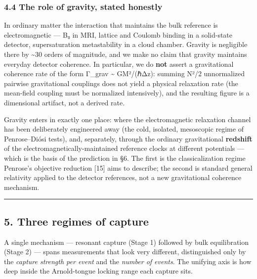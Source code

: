 \documentclass[
]{article}
\begin{document}
\subsubsection{4.4 The role of gravity, stated
honestly}\label{the-role-of-gravity-stated-honestly}

In ordinary matter the interaction that maintains the bulk reference is
electromagnetic --- B₀ in MRI, lattice and Coulomb binding in a
solid-state detector, supersaturation metastability in a cloud chamber.
Gravity is negligible there by \textasciitilde30 orders of magnitude,
and we make no claim that gravity maintains everyday detector coherence.
In particular, we do \textbf{not} assert a gravitational coherence rate
of the form Γ\_grav \textasciitilde{} GM²/(ℏΔz): summing N²/2
unnormalized pairwise gravitational couplings does not yield a physical
relaxation rate (the mean-field coupling must be normalized
intensively), and the resulting figure is a dimensional artifact, not a
derived rate.

Gravity enters in exactly one place: where the electromagnetic
relaxation channel has been deliberately engineered away (the cold,
isolated, mesoscopic regime of Penrose--Diósi tests), and, separately,
through the ordinary gravitational \textbf{redshift} of the
electromagnetically-maintained reference clocks at different potentials
--- which is the basis of the prediction in §6. The first is the
classicalization regime Penrose's objective reduction {[}15{]} aims to
describe; the second is standard general relativity applied to the
detector references, not a new gravitational coherence mechanism.

\begin{center}\rule{0.5\linewidth}{0.5pt}\end{center}

\subsection{5. Three regimes of capture}\label{three-regimes-of-capture}

A single mechanism --- resonant capture (Stage 1) followed by bulk
equilibration (Stage 2) --- spans measurements that look very different,
distinguished only by the \emph{capture strength per event} and the
\emph{number of events}. The unifying axis is how deep inside the
Arnold-tongue locking range each capture sits.
\end{document}
